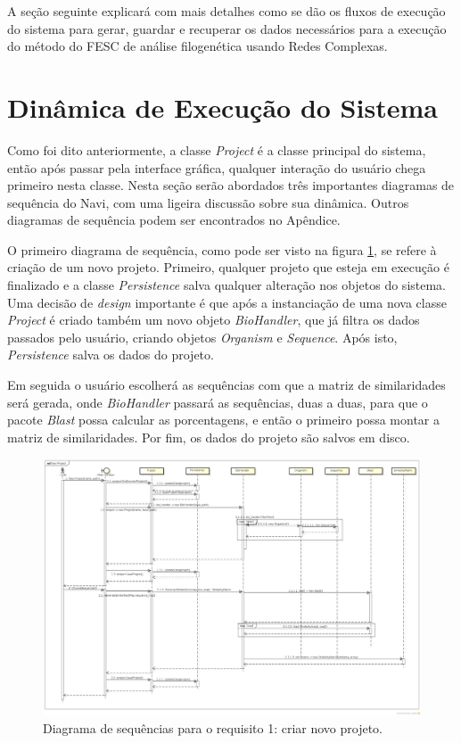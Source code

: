 A seção seguinte explicará com mais detalhes como se dão os fluxos de execução do sistema para gerar, guardar e recuperar os dados necessários para a
execução do método do FESC de análise filogenética usando Redes Complexas.

\section{Dinâmica de Execução do Sistema} \label{sec:dinamica}

Como foi dito anteriormente, a classe \textit{Project} é a classe principal do sistema, então após passar pela interface gráfica, qualquer interação do
usuário chega primeiro nesta classe. Nesta seção serão abordados três importantes diagramas de sequência do Navi, com uma ligeira discussão sobre sua
dinâmica. Outros diagramas de sequência podem ser encontrados no Apêndice.

O primeiro diagrama de sequência, como pode ser visto na figura \ref{fig:new-project}, se refere à criação de um novo projeto. Primeiro, qualquer projeto
que esteja em execução é finalizado e a classe \textit{Persistence} salva qualquer alteração nos objetos do sistema. Uma decisão de \textit{design} importante
é que após a instanciação de uma nova classe \textit{Project} é criado também um novo objeto \textit{BioHandler}, que já filtra os dados passados pelo
usuário, criando objetos \textit{Organism} e \textit{Sequence}. Após isto, \textit{Persistence} salva os dados do projeto.

Em seguida o usuário escolherá as sequências com que a matriz de similaridades será gerada, onde \textit{BioHandler} passará as sequências, duas a duas,
para que o pacote \textit{Blast} possa calcular as porcentagens, e então o primeiro possa montar a matriz de similaridades. Por fim, os dados do projeto
são salvos em disco. \newline

\begin{figure}
\centering
\includegraphics[scale=0.27]{new-project}
\caption{Diagrama de sequências para o requisito 1: criar novo projeto.}
\label{fig:new-project}
\end{figure}


